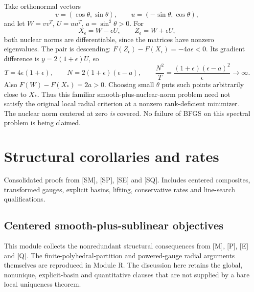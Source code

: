 \documentclass[10pt,oneside,openany]{book}
\newcommand{\ModuleTag}{I}
\theoremstyle{remark}\newtheorem{remark}{Remark}[chapter]
\newcommand{\StartModule}[3]{\cleardoublepage\renewcommand{\ModuleTag}{#1}\chapter{#2}\label{#1:chapter}\begin{small}\color{Accent}#3\end{small}\par\vspace{3pt}{\color{RuleGray}\hrule}\vspace{9pt}}
\begin{document}
Take orthonormal vectors
\[
 v=(\cos\theta,\sin\theta),\qquad u=(-\sin\theta,\cos\theta),
\]
and let $W=vv^T$, $U=uu^T$, $a=\sin^2\theta>0$. For
\[
 X_\epsilon=W-\epsilon U,\qquad Z_\epsilon=W+\epsilon U,
\]
both nuclear norms are differentiable, since the matrices have nonzero eigenvalues. The pair is descending: $F(Z_\epsilon)-F(X_\epsilon)=-4a\epsilon<0$. Its gradient difference is $y=2(1+\epsilon)U$, so
\[
 T=4\epsilon(1+\epsilon),\qquad
 N=2(1+\epsilon)(\epsilon-a),\qquad
 \frac{N^2}{T}=\frac{(1+\epsilon)(\epsilon-a)^2}{\epsilon}\to\infty.
\]
Also $F(W)-F(X_*)=2a>0$. Choosing small $\theta$ puts such points arbitrarily close to $X_*$. Thus this familiar smooth-plus-nuclear-norm problem need not satisfy the original local radial criterion at a nonzero rank-deficient minimizer. The nuclear norm centered at zero \emph{is} covered. No failure of BFGS on this spectral problem is being claimed.


\endgroup


\StartModule{F}{Structural corollaries and rates}{Consolidated proofs from [SM], [SP], [SE] and [SQ]. Includes centered composites, transformed gauges, explicit basins, lifting, conservative rates and line-search qualifications.}

\section{Centered smooth-plus-sublinear objectives}
This module collects the nonredundant structural consequences from [M], [P], [E] and [Q]. The finite-polyhedral-partition and powered-gauge radial arguments themselves are reproduced in Module R. The discussion here retains the global, nonunique, explicit-basin and quantitative clauses that are not supplied by a bare local uniqueness theorem.
\end{document}
